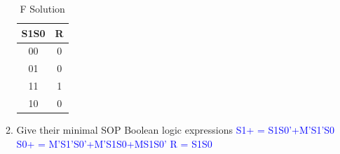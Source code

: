 \documentclass{article}
\begin{document}
\begin{enumerate}[label=(\alph*)]
\begin{enumerate}[label=(\roman*),nolistsep]
        \begin{table}[!h]
        \centering
        \begin{tabular}{|c|c|}
        \hline
        S1S0 & R\\
        \hline
        00 & 0 \\
        01 & 0 \\
        11 & 1 \\
        10 & 0 \\
        \hline
        \end{tabular}
        \caption{F Solution}
        \end {table}
            \item Give their minimal SOP Boolean logic expressions \newline\textcolor{blue}{S1+ = S1S0’+M’S1'S0\newline
S0+ = M’S1'S0'+M’S1S0+MS1S0’\newline
R = S1S0}
    
    \end{enumerate}


\newpage
    

\end{enumerate}
\end{document}
